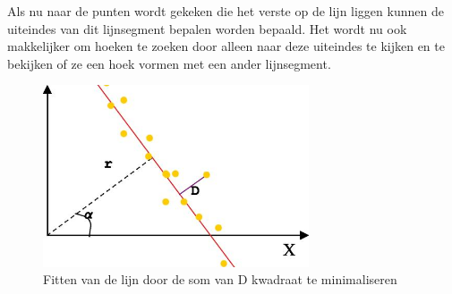 \documentclass[a4paper]{article}
\begin{document}
Als nu naar de punten wordt gekeken die het verste op de lijn liggen kunnen de uiteindes van dit lijnsegment bepalen worden bepaald. Het wordt nu ook makkelijker om hoeken te zoeken door alleen naar deze uiteindes te kijken en te bekijken of ze een hoek vormen met een ander lijnsegment. 

\begin{figure}[h]
	\centering
	\includegraphics[width=0.7\textwidth]{img/stolenline.png}
	\caption{Fitten van de lijn door de som van D kwadraat te minimaliseren}
	\label{fig:linefit}
\end{figure}
\end{document}

